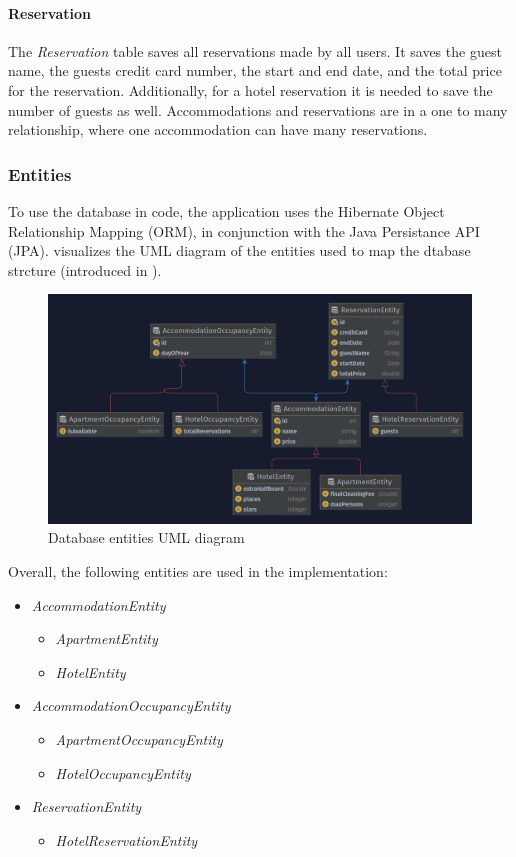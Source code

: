 \paragraph{Reservation}
The \textit{Reservation} table saves all reservations made by all users. It saves the guest name, the guests credit card number, the start and end date, and the total price for the reservation. Additionally, for a hotel reservation it is needed to save the number of guests as well. Accommodations and reservations are in a one to many relationship, where one accommodation can have many reservations.

\subsubsection{Entities}\label{sec:02_design_db_entities}
To use the database in code, the application uses the Hibernate Object Relationship Mapping (ORM), in conjunction with the Java Persistance API (JPA).  visualizes the UML diagram of the entities used to map the dtabase strcture (introduced in ).
\begin{figure}[h]
\centering
\includegraphics[scale=0.22]{images/02_design/design-entities}
\caption{Database entities UML diagram}
\label{fig:02_design_db_entities_uml}
\end{figure}
Overall, the following entities are used in the implementation:
\begin{itemize}
\item \textit{AccommodationEntity}
\begin{itemize}
\item \textit{ApartmentEntity}
\item \textit{HotelEntity}
\end{itemize}

\item \textit{AccommodationOccupancyEntity}
\begin{itemize}
\item \textit{ApartmentOccupancyEntity}
\item \textit{HotelOccupancyEntity}
\end{itemize}

\item \textit{ReservationEntity}
\begin{itemize}
\item \textit{HotelReservationEntity}
\end{itemize}
\end{itemize}


